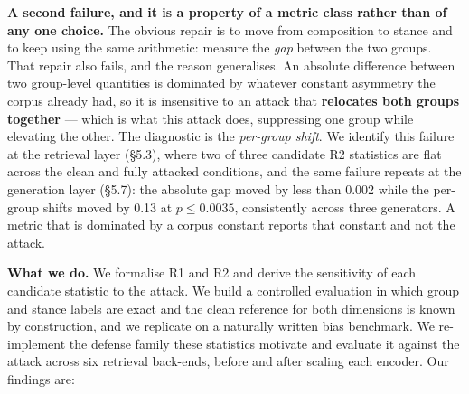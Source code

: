 \documentclass[authoryear,review,3p,times]{elsarticle}
\begin{document}
\textbf{A second failure, and it is a property of a metric class rather than of any one choice.} The obvious repair is to move from composition to stance and to keep using the same arithmetic: measure the \emph{gap} between the two groups. That repair also fails, and the reason generalises. An absolute difference between two group-level quantities is dominated by whatever constant asymmetry the corpus already had, so it is insensitive to an attack that \textbf{relocates both groups together} --- which is what this attack does, suppressing one group while elevating the other. The diagnostic is the \emph{per-group shift}. We identify this failure at the retrieval layer (§5.3), where two of three candidate R2 statistics are flat across the clean and fully attacked conditions, and the same failure repeats at the generation layer (§5.7): the absolute gap moved by less than 0.002 while the per-group shifts moved by 0.13 at \(p \le 0.0035\), consistently across three generators. A metric that is dominated by a corpus constant reports that constant and not the attack.

\textbf{What we do.} We formalise R1 and R2 and derive the sensitivity of each candidate statistic to the attack. We build a controlled evaluation in which group and stance labels are exact and the clean reference for both dimensions is known by construction, and we replicate on a naturally written bias benchmark. We re-implement the defense family these statistics motivate and evaluate it against the attack across six retrieval back-ends, before and after scaling each encoder. Our findings are:
\end{document}
